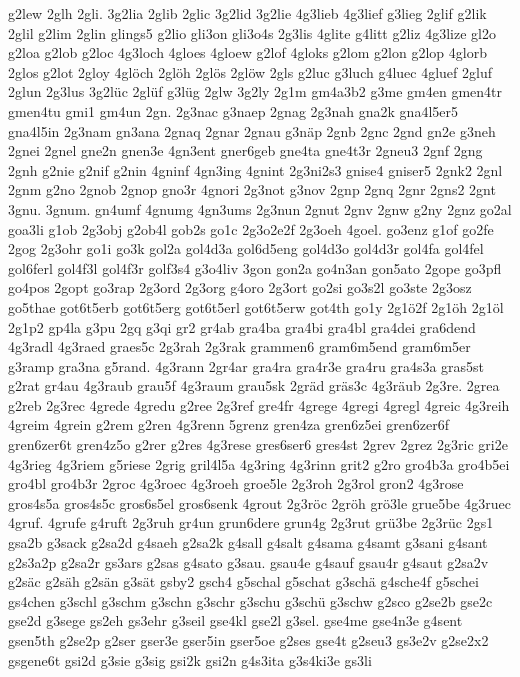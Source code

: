 {g2lew
2glh
2gli.
3g2lia
2glib
2glic
3g2lid
3g2lie
4g3lieb
4g3lief
g3lieg
2glif
g2lik
2glil
g2lim
2glin
glings5
g2lio
gli3on
gli3o4s
2g3lis
4glite
g4litt
g2liz
4g3lize
gl2o
g2loa
g2lob
g2loc
4g3loch
4gloes
4gloew
g2lof
4gloks
g2lom
g2lon
g2lop
4glorb
2glos
g2lot
2gloy
4glöch
2glöh
2glös
2glöw
2gls
g2luc
g3luch
g4luec
4gluef
2gluf
2glun
2g3lus
3g2lüc
2glüf
g3lüg
2glw
3g2ly
2g1m
gm4a3b2
g3me
gm4en
gmen4tr
gmen4tu
gmi1
gm4un
2gn.
2g3nac
g3naep
2gnag
2g3nah
gna2k
gna4l5er5
gna4l5in
2g3nam
gn3ana
2gnaq
2gnar
2gnau
g3näp
2gnb
2gnc
2gnd
gn2e
g3neh
2gnei
2gnel
gne2n
gnen3e
4gn3ent
gner6geb
gne4ta
gne4t3r
2gneu3
2gnf
2gng
2gnh
g2nie
g2nif
g2nin
4gninf
4gn3ing
4gnint
2g3ni2s3
gnise4
gniser5
2gnk2
2gnl
2gnm
g2no
2gnob
2gnop
gno3r
4gnori
2g3not
g3nov
2gnp
2gnq
2gnr
2gns2
2gnt
3gnu.
3gnum.
gn4umf
4gnumg
4gn3ums
2g3nun
2gnut
2gnv
2gnw
g2ny
2gnz
go2al
goa3li
g1ob
2g3obj
g2ob4l
gob2s
go1c
2g3o2e2f
2g3oeh
4goel.
go3enz
g1of
go2fe
2gog
2g3ohr
go1i
go3k
gol2a
gol4d3a
gol6d5eng
gol4d3o
gol4d3r
gol4fa
gol4fel
gol6ferl
gol4f3l
gol4f3r
golf3s4
g3o4liv
3gon
gon2a
go4n3an
gon5ato
2gope
go3pfl
go4pos
2gopt
go3rap
2g3ord
2g3org
g4oro
2g3ort
go2si
go3s2l
go3ste
2g3osz
go5thae
got6t5erb
got6t5erg
got6t5erl
got6t5erw
got4th
go1y
2g1ö2f
2g1öh
2g1öl
2g1p2
gp4la
g3pu
2gq
g3qi
gr2
gr4ab
gra4ba
gra4bi
gra4bl
gra4dei
gra6dend
4g3radl
4g3raed
graes5c
2g3rah
2g3rak
grammen6
gram6m5end
gram6m5er
g3ramp
gra3na
g5rand.
4g3rann
2gr4ar
gra4ra
gra4r3e
gra4ru
gra4s3a
gras5st
g2rat
gr4au
4g3raub
grau5f
4g3raum
grau5sk
2gräd
gräs3c
4g3räub
2g3re.
2grea
g2reb
2g3rec
4grede
4gredu
g2ree
2g3ref
gre4fr
4grege
4gregi
4gregl
4greic
4g3reih
4greim
4grein
g2rem
g2ren
4g3renn
5grenz
gren4za
gren6z5ei
gren6zer6f
gren6zer6t
gren4z5o
g2rer
g2res
4g3rese
gres6ser6
gres4st
2grev
2grez
2g3ric
gri2e
4g3rieg
4g3riem
g5riese
2grig
gril4l5a
4g3ring
4g3rinn
grit2
g2ro
gro4b3a
gro4b5ei
gro4bl
gro4b3r
2groc
4g3roec
4g3roeh
groe5le
2g3roh
2g3rol
gron2
4g3rose
gros4s5a
gros4s5c
gros6s5el
gros6senk
4grout
2g3röc
2gröh
grö3le
grue5be
4g3ruec
4gruf.
4grufe
g4ruft
2g3ruh
gr4un
grun6dere
grun4g
2g3rut
grü3be
2g3rüc
2gs1
gsa2b
g3sack
g2sa2d
g4saeh
g2sa2k
g4sall
g4salt
g4sama
g4samt
g3sani
g4sant
g2s3a2p
g2sa2r
gs3ars
g2sas
g4sato
g3sau.
gsau4e
g4sauf
gsau4r
g4saut
g2sa2v
g2säc
g2säh
g2sän
g3sät
gsby2
gsch4
g5schal
g5schat
g3schä
g4sche4f
g5schei
gs4chen
g3schl
g3schm
g3schn
g3schr
g3schu
g3schü
g3schw
g2sco
g2se2b
gse2c
gse2d
g3sege
gs2eh
gs3ehr
g3seil
gse4kl
gse2l
g3sel.
gse4me
gse4n3e
g4sent
gsen5th
g2se2p
g2ser
gser3e
gser5in
gser5oe
g2ses
gse4t
g2seu3
gs3e2v
g2se2x2
gsgene6t
gsi2d
g3sie
g3sig
gsi2k
gsi2n
g4s3ita
g3s4ki3e
gs3li
}
